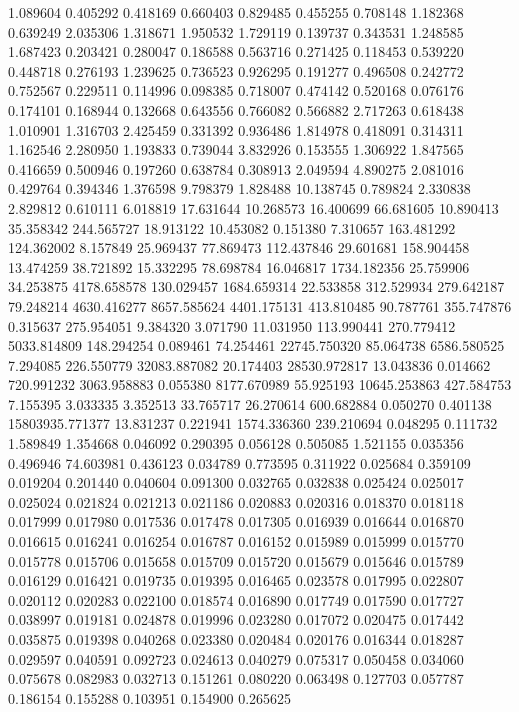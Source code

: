 1.089604
0.405292
0.418169
0.660403
0.829485
0.455255
0.708148
1.182368
0.639249
2.035306
1.318671
1.950532
1.729119
0.139737
0.343531
1.248585
1.687423
0.203421
0.280047
0.186588
0.563716
0.271425
0.118453
0.539220
0.448718
0.276193
1.239625
0.736523
0.926295
0.191277
0.496508
0.242772
0.752567
0.229511
0.114996
0.098385
0.718007
0.474142
0.520168
0.076176
0.174101
0.168944
0.132668
0.643556
0.766082
0.566882
2.717263
0.618438
1.010901
1.316703
2.425459
0.331392
0.936486
1.814978
0.418091
0.314311
1.162546
2.280950
1.193833
0.739044
3.832926
0.153555
1.306922
1.847565
0.416659
0.500946
0.197260
0.638784
0.308913
2.049594
4.890275
2.081016
0.429764
0.394346
1.376598
9.798379
1.828488
10.138745
0.789824
2.330838
2.829812
0.610111
6.018819
17.631644
10.268573
16.400699
66.681605
10.890413
35.358342
244.565727
18.913122
10.453082
0.151380
7.310657
163.481292
124.362002
8.157849
25.969437
77.869473
112.437846
29.601681
158.904458
13.474259
38.721892
15.332295
78.698784
16.046817
1734.182356
25.759906
34.253875
4178.658578
130.029457
1684.659314
22.533858
312.529934
279.642187
79.248214
4630.416277
8657.585624
4401.175131
413.810485
90.787761
355.747876
0.315637
275.954051
9.384320
3.071790
11.031950
113.990441
270.779412
5033.814809
148.294254
0.089461
74.254461
22745.750320
85.064738
6586.580525
7.294085
226.550779
32083.887082
20.174403
28530.972817
13.043836
0.014662
720.991232
3063.958883
0.055380
8177.670989
55.925193
10645.253863
427.584753
7.155395
3.033335
3.352513
33.765717
26.270614
600.682884
0.050270
0.401138
15803935.771377
13.831237
0.221941
1574.336360
239.210694
0.048295
0.111732
1.589849
1.354668
0.046092
0.290395
0.056128
0.505085
1.521155
0.035356
0.496946
74.603981
0.436123
0.034789
0.773595
0.311922
0.025684
0.359109
0.019204
0.201440
0.040604
0.091300
0.032765
0.032838
0.025424
0.025017
0.025024
0.021824
0.021213
0.021186
0.020883
0.020316
0.018370
0.018118
0.017999
0.017980
0.017536
0.017478
0.017305
0.016939
0.016644
0.016870
0.016615
0.016241
0.016254
0.016787
0.016152
0.015989
0.015999
0.015770
0.015778
0.015706
0.015658
0.015709
0.015720
0.015679
0.015646
0.015789
0.016129
0.016421
0.019735
0.019395
0.016465
0.023578
0.017995
0.022807
0.020112
0.020283
0.022100
0.018574
0.016890
0.017749
0.017590
0.017727
0.038997
0.019181
0.024878
0.019996
0.023280
0.017072
0.020475
0.017442
0.035875
0.019398
0.040268
0.023380
0.020484
0.020176
0.016344
0.018287
0.029597
0.040591
0.092723
0.024613
0.040279
0.075317
0.050458
0.034060
0.075678
0.082983
0.032713
0.151261
0.080220
0.063498
0.127703
0.057787
0.186154
0.155288
0.103951
0.154900
0.265625
